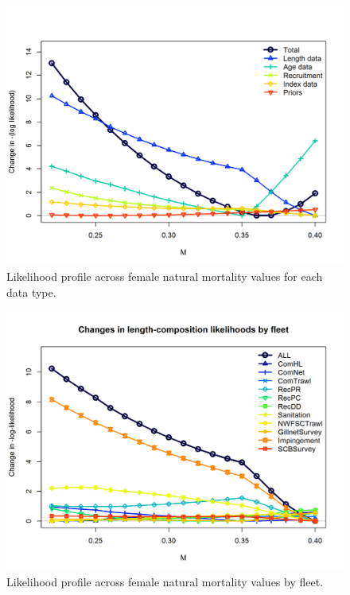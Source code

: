 \documentclass[12pt,]{article}
\begin{document}
\begin{figure}[htbp]
\centering
\includegraphics{Figures/profile_m_like.png}
\caption{Likelihood profile across female natural mortality values for
each data type. \label{fig:profile_m_like}}
\end{figure}

\begin{figure}[htbp]
\centering
\includegraphics{Figures/profile_m_piner.png}
\caption{Likelihood profile across female natural mortality values by
fleet. \label{fig:profile_m_piner}}
\end{figure}
\end{document}
